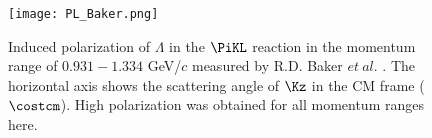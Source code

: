 \begin{comment}
We requested a 34-day beam time, including a 29-day production run and 5-day commissioning and calibration runs, as the first stage to measure the differential cross-sections and the analyzing power by accumulating 50 M momentum-tagged beam $\Lambda$s. We also requested an additional 34-day beam time as the second stage, including the production, commissioning, and calibration runs with the same ratio to measure the depolarization and to improve the accuracy of the differential cross-section and analyzing power measurements. Since the momentum dependence of the differential cross-section is expected to become large toward the $\SN$ threshold range \cite{Miwa-LpProp}, the differential cross-section will be measured with the beam $\Lambda$ momentum step of $dp_{\Lambda}=50$ MeV/$c$. The analyzing power and depolarization will be measured with the beam $\Lambda$ momentum step of $dp_{\Lambda}=100$ MeV/$c$. 
\end{comment}


\begin{figure}[!h]
  \begin{center}
   \texttt{[image: PL\_Baker.png]}
   \caption{Induced polarization of $\Lambda$ in the $\PiKL$ reaction in the momentum range of $0.931-1.334$ GeV/$c$ measured by R.D. Baker $et\ al.$ \cite{Baker}. The horizontal axis shows the scattering angle of $\Kz$ in the CM frame ($\costcm$). High polarization was obtained for all momentum ranges here.}
   \label{fig-PL_Baker}
 \end{center}
\end{figure}

\begin{comment}
\begin{figure}[!h]
  \begin{center}
   \texttt{[image: E86setup.png]}
   \caption{Experimental setup of the J-PARC E86 \cite{Miwa-LpProp}. To accurately measure the beam timing and momentum, beam timing hodoscope BH1 and beam fiber tracker BFT-U will be installed upstream of the D magnet, and BFT-D and BH2 will be installed downstream of the magnet. To measure the beam position at the LH$_{2}$ target, VFT will be installed just upstream of the target.}
   \label{fig-E86setup}
 \end{center}
\end{figure}
\end{comment}



%
